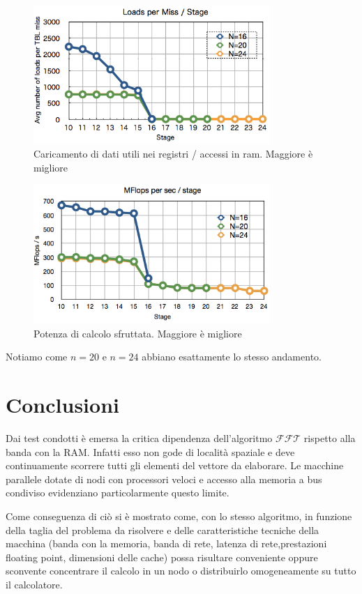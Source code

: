\documentclass[12pt,a4paper,oneside,openright]{article}
\begin{document}
\begin{figure}[h!]
  \centering
      \includegraphics[width=0.8\textwidth]{immagini/Miss}
  \caption{Caricamento di dati utili nei registri / accessi in ram. Maggiore è migliore}
\label{Miss}
\end{figure}

\begin{figure}[h!] 
  \centering
      \includegraphics[width=0.8\textwidth]{immagini/Mflops}
  \caption{Potenza di calcolo sfruttata. Maggiore è migliore}
\label{MFlops}
\end{figure}
Notiamo come $n=20$ e $n=24$ abbiano esattamente lo stesso andamento.

\section*{Conclusioni}

Dai test condotti è emersa la critica dipendenza dell'algoritmo $\mathcal{FFT}$ rispetto alla banda con la RAM. Infatti esso non gode di località spaziale e deve continuamente scorrere tutti gli elementi del vettore da elaborare. Le macchine parallele dotate di nodi con processori veloci e accesso alla memoria a bus condiviso evidenziano particolarmente questo limite.

Come conseguenza di ciò si è mostrato come, con lo stesso algoritmo, in funzione della taglia del problema da risolvere e delle caratteristiche tecniche della macchina (banda con la memoria, banda di rete, latenza di rete,prestazioni floating point, dimensioni delle cache) possa risultare conveniente oppure sconvente concentrare il calcolo in un nodo o distribuirlo omogeneamente su tutto il calcolatore.
\end{document}
